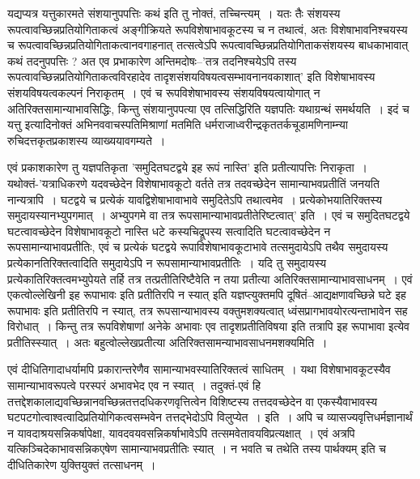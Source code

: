 {यद्यप्यत्र यत्तुकारमते संशयानुपपत्तिः कथं इति तु नोक्तं, तच्चिन्त्यम्~। यतः तैः संशयस्य रूपत्वावच्छिन्नप्रतियोगिताकत्वं अङ्गीक्रियते  रूपविशेषाभावकूटस्य च न तथात्वं, अतः विशेषाभावनिश्चयस्य च रूपत्वावच्छिन्नप्रतियोगिताकत्वानवगाहनात् तत्सत्वेऽपि रूपत्वावच्छिन्नप्रतियोगिताकसंशयस्य बाधकाभावात् कथं तदनुपपत्तिः ? अत एव प्रभाकारेण अन्ति\-मदोषः--’तत्र तदनिश्चयेऽपि तस्य रूपत्वावच्छिन्नप्रतियोगिताकत्वविरहादेव तादृशसंशयविषयत्वसम्भावनानवकाशात्’ इति विशेषाभावस्य संशयविषयत्वकल्पनं निराकृतम्~। एवं च रूपविशेषाभावस्य संशयविषयत्वायोगात् न अतिरिक्तसामान्याभावसिद्धिः, किन्तु संशयानुपपत्या एव तत्सिद्धिरिति यज्ञपतिः यथाग्रन्थं समर्थयति~। इदं च यत्तु इत्यादिनोक्तं अभिनववाचस्पतिमिश्राणां मतमिति धर्मराजाध्वरीन्द्रकृततर्कचूडामणिनाम्न्या रुचिदत्तकृतप्रकाशस्य व्याख्ययावगम्यते~। 

एवं प्रकाशकारेण तु यज्ञपतिकृता ’समुदितघटद्वये इह रूपं नास्ति’ इति प्रतीत्यापत्तिः निराकृता~। यथोक्तं-’यत्राधिकरणे यदवच्छेदेन विशेषाभावकूटो वर्तते तत्र तदवच्छेदेन सामान्याभवप्रतीतिं जनयति नान्यत्रापि~। घटद्वये च प्रत्येकं यावद्विशेषाभावाभावे समुदितेऽपि तथात्वमेव~। प्रत्येकोभयातिरिक्तस्य समुदायस्यानभ्युपगमात्~। अभ्युपगमे वा तत्र रूपसामान्याभावप्रतीतेरिष्टत्वात्’ इति~। एवं च समुदितघटद्वये घटत्वावच्छेदेन विशेषाभावकूटो नास्ति धटे कस्यचिद्रूपस्य सत्वादिति घटत्वावच्छेदेन न रूपसामान्याभावप्रतीतिः, एवं च प्रत्येकं घटद्वये रूपाविशेषाभावकूटाभावे तत्समुदायेऽपि तथैव समुदायस्य प्रत्येकानतिरिक्तत्वादिति समुदायेऽपि न रूपसामान्याभावप्रतीतिः~। यदि तु  समुदायस्य प्रत्येकातिरिक्तत्वमभ्युपेयते तर्हि तत्र तत्प्रतीतिरिष्टैवेति न तया प्रतीत्या अतिरिक्तसामान्याभावसाधनम्~। एवं एकत्वोल्लेखिनी इह रूपाभावः इति प्रतीतिरपि न स्यात् इति यज्ञप्त्युक्तमपि दूषितं–आद्यक्षणावच्छिन्ने घटे इह रूपाभावः इति प्रतीतिरपि न स्यात्, तत्र रूपसान्याभावस्य वक्तुमशक्यत्वात् ध्वंसप्रागभावयोरत्यन्ताभावेन सह विरोधात्~। किन्तु तत्र रूपविशेषाणां अनेके  अभावाः एव तादृशप्रतीतिविषया इति तत्रापि इह रूपाभावा इत्येव प्रतीतिस्स्यात्~। अतः बहुत्वोल्लेखप्रतीत्या अतिरिक्तसामन्याभावसाधनमशक्यमिति~। 

एवं दीधितिगादाधर्यामपि प्रकारान्तरेणैव सामान्याभवस्यातिरिक्तत्वं साधितम्~। यथा विशेषाभावकूटस्यैव सामान्याभावरूपत्वे परस्परं अभावभेद एव न स्यात्~। तदुक्तं-एवं हि तत्तद्देशकालाद्यवच्छिन्नानवच्छिन्नतत्तदधिकरणवृत्तित्वेन विशिष्टस्य तत्तदवच्छेदेन वा एकस्यैवाभावस्य घटपटगोत्वाश्वत्वादिप्रतियोगिकत्वसम्भवेन तत्तद्भेदोऽपि विलुप्येत~। इति~। अपि च व्यासज्यवृत्तिधर्मज्ञानार्थं न यावदाश्रयसन्निकर्षापेक्षा, यावदवयवसन्निकर्षाभावेऽपि तत्समवेतावयविप्रत्यक्षात्~। एवं अत्रपि यत्किञ्चिदेकाभावसन्निकएषेण सामान्याभवप्रतीतिः स्यात्~। न भवति च तथेति तस्य पार्थक्यम् इति च दीधितिकारेण युक्तियुक्तं तत्साधनम्~। 

}
